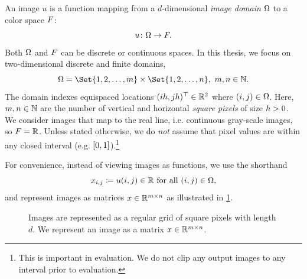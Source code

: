 An image \( u \) is a function mapping from a \( d \)-dimensional \emph{image domain} \( \Omega \) to a color space \( F \):
\begin{equation}
	u \colon \Omega \to F.
\end{equation}
Both \( \Omega \) and \( F\) can be discrete or continuous spaces.
In this thesis, we focus on two-dimensional discrete and finite domains,
\begin{equation}
	\Omega = \Set{\num{1}, \num{2}, \dotsc, \Height} \times \Set{\num{1}, \num{2}, \dotsc, \Width},\ \Height, \Width \in \mathbb{N}.
\end{equation}
The domain indexes equispaced locations \( (ih, jh)^\top \in \mathbb{R}^{\num{2}} \) where \( (i, j) \in \Omega \).
Here, \( m, n \in \mathbb{N} \) are the number of vertical and horizontal \emph{square pixels} of size \( h > \num{0} \).
We consider images that map to the real line, i.e. continuous gray-scale images, so \( F = \mathbb{R} \).
Unless stated otherwise, we do \emph{not} assume that pixel values are within any closed interval (e.g. \( \interval{\num{0}}{\num{1}} \)).\footnote{%
	This is important in evaluation.
	We do not clip any output images to any interval prior to evaluation.
}

For convenience, instead of viewing images as functions, we use the shorthand
\begin{equation}
	x_{i,j} \coloneqq u(i, j) \in \mathbb{R} \text{ for all } (i, j) \in \Omega,
\end{equation}
and represent images as matrices \( x \in \mathbb{R}^{m\times n} \) as illustrated in \cref{fig:image representation}.
\begin{figure}
	\centering
	\caption[Representation of an image]{%
		Images are represented as a regular grid of square pixels with length \( d \).
		We represent an image as a matrix \( x \in \mathbb{R}^{m\times n} \).
	}%
	\label{fig:image representation}
\end{figure}
